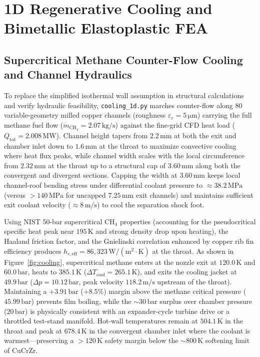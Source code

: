 \documentclass[11pt,a4paper]{article}
\begin{document}
\section{1D Regenerative Cooling and Bimetallic Elastoplastic FEA}

\subsection{Supercritical Methane Counter-Flow Cooling and Channel Hydraulics}
To replace the simplified isothermal wall assumption in structural calculations and verify hydraulic feasibility, \texttt{cooling\_1d.py} marches counter-flow along $80$ variable-geometry milled copper channels (roughness $\varepsilon_r = 5\,\mathrm{\mu m}$) carrying the full methane fuel flow ($\dot{m}_{\mathrm{CH_4}} = 2.07\,\mathrm{kg/s}$) against the fine-grid CFD heat load ($Q_{\mathrm{tot}} = 2.008\,\mathrm{MW}$). Channel height tapers from $2.2\,\mathrm{mm}$ at both the exit and chamber inlet down to $1.6\,\mathrm{mm}$ at the throat to maximize convective cooling where heat flux peaks, while channel width scales with the local circumference from $2.32\,\mathrm{mm}$ at the throat up to a structural cap of $3.60\,\mathrm{mm}$ along both the convergent and divergent sections. Capping the width at $3.60\,\mathrm{mm}$ keeps local channel-roof bending stress under differential coolant pressure to $\approx 38.2\,\mathrm{MPa}$ (versus $>140\,\mathrm{MPa}$ for uncapped $7.25\,\mathrm{mm}$ exit channels) and maintains sufficient exit coolant velocity ($\approx 8\,\mathrm{m/s}$) to cool the separation shock foot.

Using NIST 50-bar supercritical $\mathrm{CH_4}$ properties (accounting for the pseudocritical specific heat peak near $195\,\mathrm{K}$ and strong density drop upon heating), the Haaland friction factor, and the Gnielinski correlation enhanced by copper rib fin efficiency produces $h_{c,\mathrm{eff}} = 86{,}323\,\mathrm{W/(m^2\cdot K)}$ at the throat. As shown in Figure~\ref{fig:cooling}, supercritical methane enters at the nozzle exit at $120.0\,\mathrm{K}$ and $60.0\,\mathrm{bar}$, heats to $385.1\,\mathrm{K}$ ($\Delta T_{\mathrm{cool}} = 265.1\,\mathrm{K}$), and exits the cooling jacket at $49.9\,\mathrm{bar}$ ($\Delta p = 10.12\,\mathrm{bar}$, peak velocity $118.2\,\mathrm{m/s}$ upstream of the throat). Maintaining a $+3.91\,\mathrm{bar}$ ($+8.5\%$) margin above the methane critical pressure ($45.99\,\mathrm{bar}$) prevents film boiling, while the $\sim 30\,\mathrm{bar}$ surplus over chamber pressure ($20\,\mathrm{bar}$) is physically consistent with an expander-cycle turbine drive or a throttled test-stand manifold. Hot-wall temperatures remain at $504.1\,\mathrm{K}$ in the throat and peak at $678.4\,\mathrm{K}$ in the convergent chamber inlet where the coolant is warmest---preserving a $>120\,\mathrm{K}$ safety margin below the $\sim 800\,\mathrm{K}$ softening limit of $\mathrm{CuCrZr}$.
\end{document}
